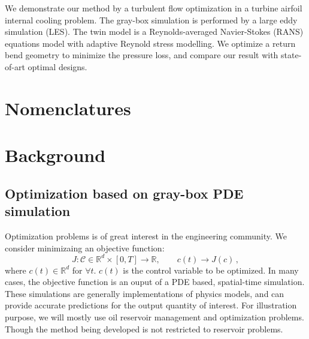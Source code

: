 \documentclass[a4paper,onecolumn]{article}
\theoremstyle{remark}
\begin{document}
\noindent We demonstrate our method by a turbulent flow optimization in a turbine airfoil
internal cooling problem. The gray-box
simulation is performed by a large eddy simulation (LES). 
The twin model is a Reynolds-averaged Navier-Stokes (RANS)
equations model with adaptive Reynold stress modelling. We optimize a return bend
geometry to minimize the pressure loss, and compare our result with state-of-art 
optimal designs.


\newpage
\tableofcontents

\newpage
\section{Nomenclatures}

\newpage
\section{Background}
\label{intro}

\subsection{Optimization based on gray-box PDE simulation}
Optimization problems is of great interest in the engineering community. We consider minimizaing an
objective function:
$$
    J: \mathcal{C} \in \mathbb{R}^d\times [0,T] \rightarrow \mathbb{R}, \qquad c(t) \rightarrow J(c)\,,
$$
where $c(t) \in \mathbb{R}^d$ for $\forall t$. $c(t)$ is the control variable to be optimized.
In many cases, the objective function is an ouput of
a PDE based, spatial-time simulation. 
These simulations are generally implementations of physics models, and can provide accurate predictions for
the output quantity of interest.
For illustration purpose, we will mostly use oil reservoir management and optimization problems.
Though the method being developed is not restricted to reservoir problems.\\
\end{document}

